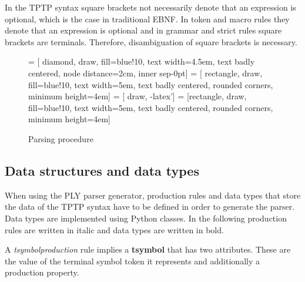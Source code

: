 In the \ac{TPTP} syntax square brackets not necessarily denote that an expression is optional, which is the case in traditional \ac{EBNF}.
In token and macro rules they denote that an expression is optional and in grammar and strict rules square brackets are terminals.
Therefore, disambiguation of square brackets is necessary.
\begin{figure}[H]
 = [ diamond, draw, fill=blue!10, text width=4.5em, text badly centered, node distance=2cm, inner sep-0pt]  
 = [ rectangle, draw, fill=blue!10, text width=5em, text badly centered, rounded corners, minimum height=4em]  
 = [ draw, -latex']  
 = [rectangle, draw, fill=blue!10, text width=5em, text badly centered, rounded corners, minimum height=4em]  
\begin{center}
\end{center}
\caption{Parsing procedure}
\label{fig:ConceptParserFlow}
\end{figure}

\subsection{Data structures and data types}\label{sec:ConceptParserDataStructure}

When using the \ac{PLY} parser generator, production rules and data types that store the data of the \ac{TPTP} syntax have to be defined in order to generate the parser. Data types are implemented using Python classes. In the following production rules are written in italic and data types are written in bold.

A \textit{t\textunderscore symbol\textunderscore  production} rule implies a \textbf{t\textunderscore symbol} that has two attributes. These are the value of the terminal symbol token it represents and additionally a production property.

